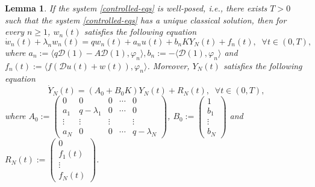 \documentclass[review]{elsarticle}
\newtheorem{lemma}[theorem]{Lemma}
\numberwithin{equation}{section}
\begin{document}
\begin{lemma}\label{lemma-mode}
    If the system \eqref{controlled-eqs} is well-posed, i.e., there exists $T>0$ such that the system \eqref{controlled-eqs} has a unique classical solution\footnotemark[2] , then for every $n\ge 1$, $w_n(t)$ satisfies the following equation
    \begin{equation}
        \label{mode-eq}  \dot{w}_n(t)+\lambda_n w_n(t)=qw_n(t)+a_n u(t) +b_n KY_N(t)+f_n(t),\;\;\forall t\in (0,T),
    \end{equation}
   where $a_n:=\langle q\mathcal{D}(1)-A \mathcal{D}(1),\varphi_n\rangle,b_n:= -\langle  \mathcal{D} (1),\varphi_n\rangle$ and $f_n(t):=\langle f\left(\mathcal{D}u(t)+w(t)\right),\varphi_n\rangle$. Moreover, $Y_N(t)$ satisfies the following equation
    \begin{equation}
    \label{mode-eq-new}
    \dot{Y}_N(t)=(A_0+B_0K)Y_N(t)+R_N(t),\;\;\forall t\in (0,T),
\end{equation}
where $A_0:=\left(\begin{array}{ccccc}
0 & 0 &0& \cdots &0 \\
a_1 &q-\lambda_1&0& \cdots & 0 \\
\vdots  & \vdots &\vdots& & \vdots\\
a_N&0&0&\cdots&q-\lambda_N
\end{array}\right)$, $B_0:=\begin{pmatrix}
1\\
b_1\\
\vdots \\
b_N
\end{pmatrix}$ and $R_N(t):=\begin{pmatrix}
0\\
 f_1(t)\\
\vdots \\
 f_N(t)
\end{pmatrix}$.
\end{lemma}
\end{document}
